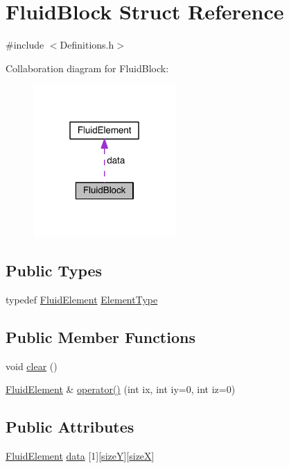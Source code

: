\hypertarget{struct_fluid_block}{}\section{Fluid\+Block Struct Reference}
\label{struct_fluid_block}


{\ttfamily \#include $<$Definitions.\+h$>$}



Collaboration diagram for Fluid\+Block\+:\nopagebreak
\begin{figure}[H]
\begin{center}
\leavevmode
\includegraphics[width=154pt]{d1/da0/struct_fluid_block__coll__graph}
\end{center}
\end{figure}
\subsection*{Public Types}
\begin{DoxyCompactItemize}
\item 
typedef \hyperlink{struct_fluid_element}{Fluid\+Element} \hyperlink{struct_fluid_block_ada33fbdab33f2688d3eb632118de5a6e}{Element\+Type}
\end{DoxyCompactItemize}
\subsection*{Public Member Functions}
\begin{DoxyCompactItemize}
\item 
void \hyperlink{struct_fluid_block_af2c2703f49640b00d0757ab6d22bdec9}{clear} ()
\item 
\hyperlink{struct_fluid_element}{Fluid\+Element} \& \hyperlink{struct_fluid_block_a0cc6dc89e9a9a3b9c1b61eda26a041eb}{operator()} (int ix, int iy=0, int iz=0)
\end{DoxyCompactItemize}
\subsection*{Public Attributes}
\begin{DoxyCompactItemize}
\item 
\hyperlink{struct_fluid_element}{Fluid\+Element} \hyperlink{struct_fluid_block_adaf63688f4901ef6640e3ee02aeabf42}{data} \mbox{[}1\mbox{]}\mbox{[}\hyperlink{struct_fluid_block_afd21ed464f6732be798bba7d87113bd2}{size\+Y}\mbox{]}\mbox{[}\hyperlink{struct_fluid_block_a4894f513519efdad2837a01cfb65f42e}{size\+X}\mbox{]}
\end{DoxyCompactItemize}
